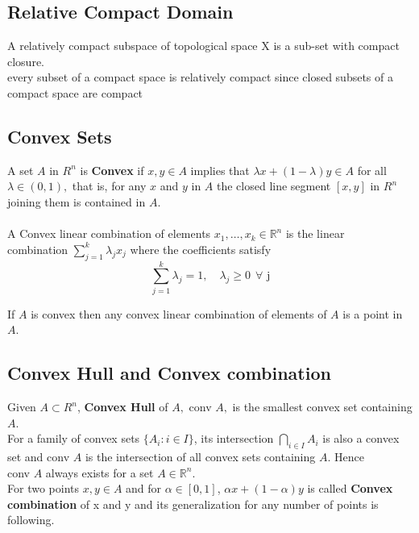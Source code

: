 \documentclass[oneside]{book}
\begin{document}
	\subsection{Relative Compact Domain} \label{ss:2}
	A relatively compact subspace of topological space X is a sub-set with compact closure. \\
	every subset of a compact space is relatively compact since closed subsets of a compact space are compact
	
	
	
	
	
	
	
	
	
	
	
	
	
	
	\subsection{Convex Sets}
	\label{ss:3}
	A set $A$ in $R^{n}$ is \textbf{Convex} if $x, y \in A$ implies that $\lambda x+(1-\lambda) y \in A$
	for all $\lambda \in(0,1),$ that is, for any $x$ and $y$ in $A$ the closed line segment $[x, y]$ in
	$R^{n}$ joining them is contained in $A .$\\~\\
	
	A Convex linear combination of elements $x_{1}, \ldots, x_{k} \in \mathbb{R}^{n}$ is the linear \\combination
	$
	\sum_{j=1}^{k} \lambda_{j} x_{j}
	$
	where the coefficients satisfy
	\[
	\sum_{j=1}^{k} \lambda_{j}=1, \quad \lambda_{j} \geq 0 \hspace{5pt} \forall   \hspace{4pt} \text{j} 
	\]
	
	
	If $A$ is convex then any convex linear combination of elements
	of $A$ is a point in $A .$\\
	
	
	\subsection{Convex Hull and Convex combination} \label{ss:4}
	Given $A \subset R^{n}$, \textbf{Convex Hull} of $A,$ conv $A,$ is the smallest
	convex set containing $A $. \\
	For a family of convex sets $\{ A_{i} :i \in I\}$, its intersection  $ \bigcap_{i \in I} A_{i}$ is  also a  convex set and conv $A$ is the intersection of all convex sets containing $A$. Hence\\ conv $A$ always exists for a set $A \in \mathbb{R}^n $. \\
	For two points $x,y \in A$ and for $\alpha \in [0,1]$, $\alpha x +(1- \alpha)y  $ is called \textbf{Convex combination} of x and y and its 
	generalization for any number of  points is following. \\
	
\end{document}
